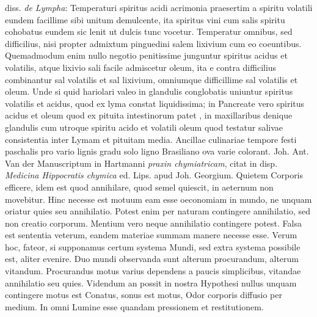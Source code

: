 diss. \textit{de Lympha}: Temperaturi spiritus acidi acrimonia praesertim a spiritu volatili eundem facillime sibi unitum demulcente, ita spiritus vini cum salis spiritu cohobatus eundem sic lenit ut dulcis tunc vocetur. Temperatur  omnibus, sed difficilius, nisi propter admixtum pinguedini salem lixivium cum eo coeuntibus. Quemadmodum enim nullo negotio penitissime junguntur spiritus acidus et volatilis, atque lixivio sali facile admiscetur oleum, ita e contra difficilius combinantur sal volatilis et sal lixivium, omniumque difficillime sal volatilis et oleum. Unde si quid hariolari valeo in glandulis conglobatis uniuntur spiritus volatilis et acidus, quod ex lyma constat liquidissima; in Pancreate vero spiritus acidus et oleum quod ex pituita intestinorum patet , in maxillaribus denique glandulis cum utroque spiritu acido et volatili oleum quod testatur salivae consistentia inter Lymam et pituitam media.
\pend%
\pstart%
Ancillae culinariae tempore festi paschalis pro vario lignis gradu solo ligno Brasiliano ova varie colorant.
\pend%
\pstart%
Joh. Ant. Van der \protect{}
Manuscriptum in Hartmanni\protect{} \textit{praxin chymiatricam}, citat
\protect{}
in disp. \textit{Medicina Hippocratis chymica} ed. Lips.\protect{}
 apud Joh. Georgium. Quietem Corporis efficere, idem est quod annihilare, quod semel quiescit, in aeternum non movebitur. Hinc necesse est motuum eam esse oeconomiam in mundo, ne unquam oriatur quies seu annihilatio. Potest enim per naturam contingere annihilatio, sed non creatio corporum. Mentium vero neque annihilatio contingere potest. Falsa est sententia veterum, eandem materiae summam manere necesse esse. Verum hoc, fateor, si supponamus certum systema Mundi, sed extra systema possibile est, aliter evenire. Duo  mundi observanda sunt alterum procurandum, alterum vitandum. Procurandus motus varius dependens a paucis simplicibus, vitandae annihilatio seu quies. Videndum an possit in nostra Hypothesi nullus unquam contingere motus  est Conatus, sonus est motus, Odor corporis diffusio per medium. In omni Lumine esse quandam pressionem et restitutionem.
